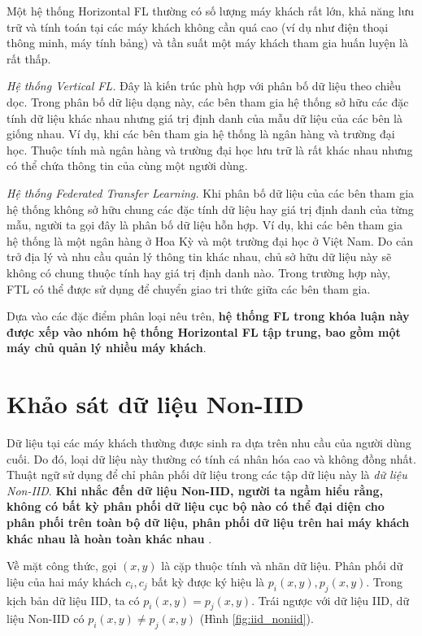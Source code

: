 Một hệ thống Horizontal FL thường có số lượng máy khách rất lớn, khả năng lưu trữ và tính toán tại các máy khách không cần quá cao (ví dụ như điện thoại thông minh, máy tính bảng) và tần suất một máy khách tham gia huấn luyện là rất thấp.

\textit{Hệ thống Vertical FL.} Đây là kiến trúc phù hợp với phân bố dữ liệu theo chiều dọc. Trong phân bố dữ liệu dạng này, các bên tham gia hệ thống sở hữu các đặc tính dữ liệu khác nhau nhưng giá trị định danh của mẫu dữ liệu của các bên là giống nhau. Ví dụ, khi các bên tham gia hệ thống là ngân hàng và trường đại học. Thuộc tính mà ngân hàng và trường đại học lưu trữ là rất khác nhau nhưng có thể chứa thông tin của cùng một người dùng.

\textit{Hệ thống Federated Transfer Learning.} Khi phân bố dữ liệu của các bên tham gia hệ thống không sở hữu chung các đặc tính dữ liệu hay giá trị định danh của từng mẫu, người ta gọi đây là phân bố dữ liệu hỗn hợp. Ví dụ, khi các bên tham gia hệ thống là một ngân hàng ở Hoa Kỳ và một trường đại học ở Việt Nam. Do cản trở địa lý và nhu cầu quản lý thông tin khác nhau, chủ sở hữu dữ liệu này sẽ không có chung thuộc tính hay giá trị định danh nào. Trong trường hợp này, FTL có thể được sử dụng để chuyển giao tri thức giữa các bên tham gia.

Dựa vào các đặc điểm phân loại nêu trên, \textbf{hệ thống FL trong khóa luận này được xếp vào nhóm hệ thống Horizontal FL tập trung, bao gồm một máy chủ quản lý nhiều máy khách}.

\section{Khảo sát dữ liệu Non-IID}

Dữ liệu tại các máy khách thường được sinh ra dựa trên nhu cầu của người dùng cuối. Do đó, loại dữ liệu này thường có tính cá nhân hóa cao và không đồng nhất. Thuật ngữ sử dụng để chỉ phân phối dữ liệu trong các tập dữ liệu này là \textit{dữ liệu Non-IID}. \textbf{Khi nhắc đến dữ liệu Non-IID, người ta ngầm hiểu rằng, không có bất kỳ phân phối dữ liệu cục bộ nào có thể đại diện cho phân phối trên toàn bộ dữ liệu, phân phối dữ liệu trên hai máy khách khác nhau là hoàn toàn khác nhau} \cite{zhu2021federated}.

Về mặt công thức, gọi $(x, y)$ là cặp thuộc tính và nhãn dữ liệu. Phân phối dữ liệu của hai máy khách $c_i, c_j$ bất kỳ được ký hiệu là $p_i(x,y), p_j(x,y)$. Trong kịch bản dữ liệu IID, ta có $p_i(x,y) = p_j(x,y)$. Trái ngược với dữ liệu IID, dữ liệu Non-IID có $p_i(x,y) \ne p_j(x,y)$ (Hình \ref{fig:iid_noniid}).

